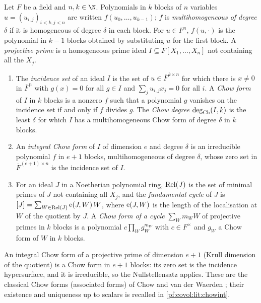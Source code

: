 \begin{definition}\label{pf:covol:def:chow}
Let $F$ be a field and $n,k\in\N$. Polynomials in $k$ blocks of $n$ variables $u=(u_{i,j})_{i<k,j<n}$
are written $f(u_0,\dots,u_{k-1})$; $f$ is \emph{multihomogeneous of degree $\delta$} if it is
homogeneous of degree $\delta$ in each block. For $u\in F^n$, $f(u,\cdot)$ is the polynomial in $k-1$
blocks obtained by substituting $u$ for the first block. A \emph{projective prime} is a homogeneous prime
ideal $I\subseteq F[X_1,\dots,X_n]$ not containing all the $X_j$.
\begin{enumerate}[label=(\alph*)]
\item The \emph{incidence set} of an ideal $I$ is the set of $u\in\overline F^{k\times n}$ for which
  there is $x\ne0$ in $\overline F^n$ with $g(x)=0$ for all $g\in I$ and $\sum_ju_{i,j}x_j=0$ for all
  $i$. A \emph{Chow form} of $I$ in $k$ blocks is a nonzero $f$ such that a polynomial $g$ vanishes on
  the incidence set if and only if $f$ divides $g$. The \emph{Chow degree} $\operatorname{deg}_{\mathrm{Ch}}(I,k)$ is the least
  $\delta$ for which $I$ has a multihomogeneous Chow form of degree $\delta$ in $k$ blocks.
\item An \emph{integral Chow form} of $I$ of dimension $e$ and degree $\delta$ is an irreducible
  polynomial $f$ in $e+1$ blocks, multihomogeneous of degree $\delta$, whose zero set in
  $\overline F^{(e+1)\times n}$ is the incidence set of $I$.
\item For an ideal $J$ in a Noetherian polynomial ring, $\operatorname{Rel}(J)$ is the set of minimal primes of
  $J$ not containing all $X_j$, and the \emph{fundamental cycle} of $J$ is
  $[J]=\sum_{W\in\operatorname{Rel}(J)}\operatorname{e}(J,W)\,W$, where $\operatorname{e}(J,W)$ is the length of the
  localisation at $W$ of the quotient by $J$. A \emph{Chow form of a cycle} $\sum_Wm_WW$ of projective
  primes in $k$ blocks is a polynomial $c\prod_Wg_W^{m_W}$ with $c\in F^\times$ and $g_W$ a Chow form of
  $W$ in $k$ blocks.
\end{enumerate}
\end{definition}

An integral Chow form of a projective prime of dimension $e+1$ (Krull dimension of the quotient) is
a Chow form in $e+1$ blocks: its zero set is the incidence hypersurface, and it is irreducible, so the
Nullstellensatz applies. These are the classical Chow forms (associated forms) of Chow and van der
Waerden \cite{ChowVanDerWaerden1937}; their existence and uniqueness up to scalars is recalled in
\cref{pf:covol:lit:chowint}.

